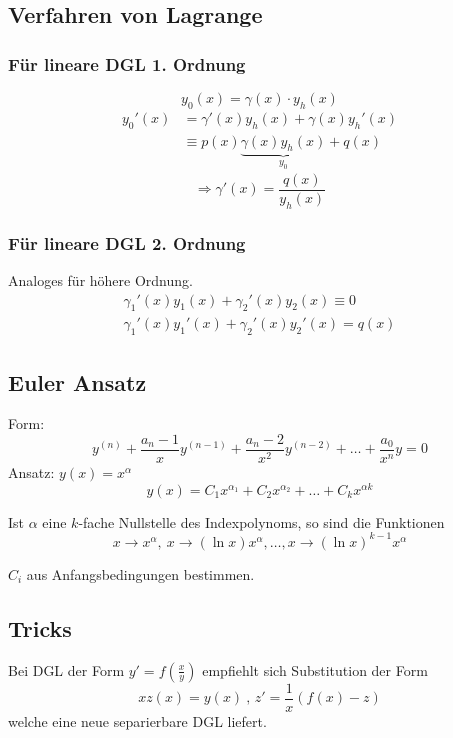 \documentclass[12pt]{article}
\begin{document}
\begin{multicols*}{3}
			\subsection{Verfahren von Lagrange} %
				\subsubsection{Für lineare DGL 1. Ordnung} %
					\[
						y_0(x) = \gamma(x) \cdot y_h(x)
					\]
					\begin{align*}
						y_0'(x) &= \gamma'(x) y_h(x) + \gamma(x) y_h'(x) \\
						&\equiv p(x) \underbrace{\gamma(x) y_h(x)}_{y_0} + q(x)
					\end{align*}
					\[
						\Rightarrow \gamma'(x) = \frac{q(x)}{y_h(x)}
					\]
				\subsubsection{Für lineare DGL 2. Ordnung} %
					Analoges für höhere Ordnung.
					\begin{gather*}
						\gamma_1'(x) y_1 (x) + \gamma_2'(x) y_2(x) \equiv 0 \\
						\gamma_1'(x) y_1' (x) + \gamma_2'(x) y_2'(x) = q(x)
					\end{gather*}
			\subsection{Euler Ansatz} %
				Form:
				\[
					y^{(n)} + \frac{a_n-1}{x} y^{(n-1)} + \frac{a_n-2}{x^2} y^{(n-2)} + \dots + \frac{a_0}{x^n} y = 0
				\]
				Ansatz: $y(x) = x^{\alpha}$
				\[
					y(x) = C_1 x^{\alpha_1} + C_2 x^{\alpha_2} + \dots + C_k x^{\alpha k}
				\]
				
				Ist $\alpha$ eine $k$-fache Nullstelle des Indexpolynoms, so sind die Funktionen
				\[
					x \to x^\alpha, \ x \to (\ln x)x^\alpha, \dots, x \to (\ln x)^{k-1}x^\alpha
				\]
				
				$C_i$ aus Anfangsbedingungen bestimmen.
			\subsection{Tricks} %
				Bei DGL der Form $y' = f(\frac{x}{y})$ empfiehlt sich Substitution der Form
				\[
					xz(x) = y(x)\ ,\, z' = \frac{1}{x} (f(x) - z)
				\]
				welche eine neue separierbare DGL liefert.

\end{multicols*}
\end{document}
